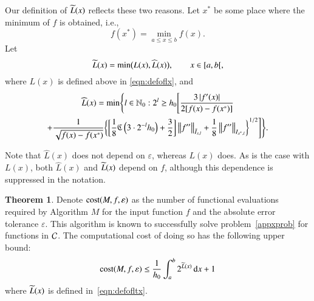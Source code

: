 \documentclass[review]{elsarticle}
\newcommand{\abstol}{\varepsilon}
\theoremstyle{definition}
\newcommand{\chL}{\widehat{L}}
\newtheorem{theorem}{Theorem}
\begin{document}
Our definition of $\widetilde{L}(x)$ reflects these two reasons. Let $x^*$ be some place
where the minimum of $f$ is obtained, i.e.,
\[
f(x^*)  = \min_{a \le x \le b} f(x).
\]
Let
\begin{equation}\label{eqn:defofltx}
\tL(x) = \min\bigl(L(x),\chL(x)\bigr), \qquad x \in [a,b[,
\end{equation}
where $L(x)$ is defined above in \eqref{eqn:defoflx}, and
\begin{multline}\label{eqn:defoflt1x}
\chL(x) = \min \Biggl\{ l \in \mathbb{N}_0 :  2^l \ge h_0 \Biggl[ \frac{3\abs{f'(x)}}{2[f(x) - f(x^*)]} \\
+  \frac{1}{\sqrt{f(x) - f(x^*)}} \biggl\{ \biggl[\frac 18 \fC\left(3\cdot2^{-l}h_0\right) + \frac 32 \biggr]   \norm[\bar{I}_{x,l}]{f''}
+ \frac18\norm[{I_{x^*,l}}]{f''} \biggr\}^{1/2} \Biggr] \Biggr\}.
\end{multline}

Note that $\chL(x)$ does not depend on $\abstol$, whereas $L(x)$ does. As is the
case with $L(x)$, both $\chL(x)$ and $\widetilde{L}(x)$ depend on $f$, although this
dependence is suppressed in the notation.

\begin{theorem}\label{thm:Mcost}
	Denote $\cost(M,f,\abstol)$ as the number of functional evaluations required by Algorithm $M$ for the input function $f$ and the absolute error tolerance $\abstol$.  This algorithm is known to successfully solve problem~\eqref{appxprob} for functions in $\mathcal{C}$.  The computational cost of doing so has the following upper bound:
	\begin{equation*}
	\cost(M,f,\abstol) \le \frac{1}{h_0}\int_a^b 2^{\tL(x)} \, \dif x +1 \\
	\end{equation*}
	where $\widetilde{L}(x)$ is defined in~\eqref{eqn:defofltx}.
\end{theorem}
\end{document}
